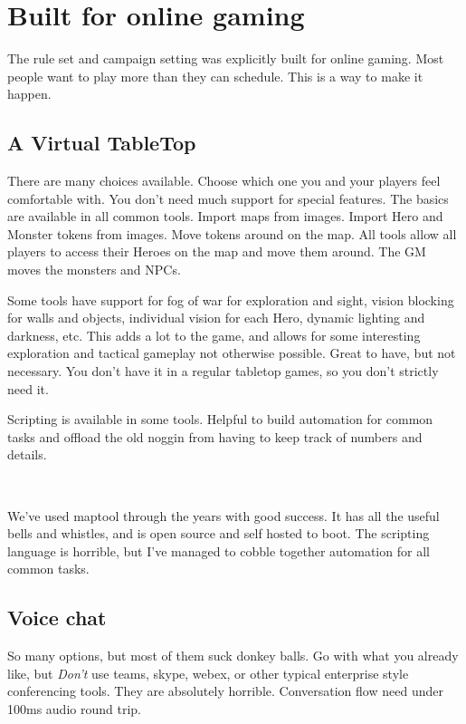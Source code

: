 \clearpage %

\section*{Built for online gaming}

The rule set and campaign setting was explicitly built for online gaming. Most people want to play more than they can schedule. This is a way to make it happen.


\subsection*{A Virtual TableTop}

There are many choices available. Choose which one you and your players feel comfortable with. You don't need much support for special features. The basics are available in all common tools. Import maps from images. Import Hero and Monster tokens from images. Move tokens around on the map. All tools allow all players to access their Heroes on the map and move them around. The GM moves the monsters and NPCs.

Some tools have support for fog of war for exploration and sight, vision blocking for walls and objects, individual vision for each Hero, dynamic lighting and darkness, etc.
This adds a lot to the game, and allows for some interesting exploration and tactical gameplay not otherwise possible.
Great to have, but not necessary. You don't have it in a regular tabletop games, so you don't strictly need it.

Scripting is available in some tools. Helpful to build automation for common tasks and offload the old noggin from having to keep track of numbers and details.

\

We've used maptool through the years with good success. It has all the useful bells and whistles, and is open source and self hosted to boot. The scripting language is horrible, but I've managed to cobble together automation for all common tasks.


\subsection*{Voice chat}

So many options, but most of them suck donkey balls. Go with what you already like, but \emph{Don't} use teams, skype, webex, or other typical enterprise style conferencing tools. They are absolutely horrible. Conversation flow need under 100ms audio round trip.

